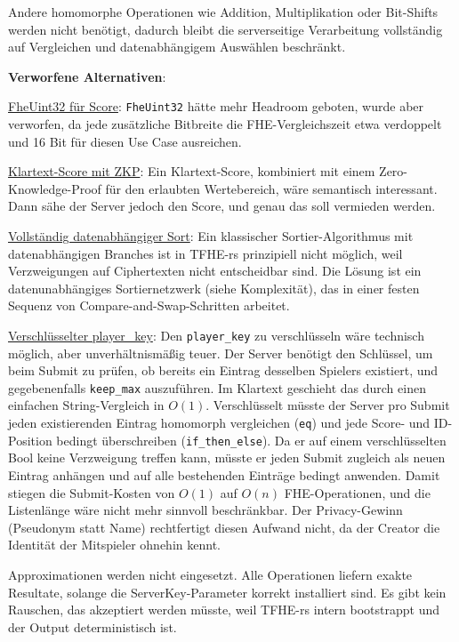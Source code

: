 Andere homomorphe Operationen wie Addition, Multiplikation oder Bit-Shifts werden nicht benötigt, dadurch bleibt die serverseitige Verarbeitung vollständig auf Vergleichen und datenabhängigem Auswählen beschränkt.

\textbf{Verworfene Alternativen}:

\underline{FheUint32 für Score}: \texttt{FheUint32} hätte mehr Headroom geboten, wurde aber verworfen, da jede zusätzliche Bitbreite die FHE-Vergleichszeit etwa verdoppelt und 16 Bit für diesen Use Case ausreichen.

\underline{Klartext-Score mit ZKP}: Ein Klartext-Score, kombiniert mit einem Zero-Knowledge-Proof für den erlaubten Wertebereich, wäre semantisch interessant. Dann sähe der Server jedoch den Score, und genau das soll vermieden werden.

\underline{Vollständig datenabhängiger Sort}: Ein klassischer Sortier-Algorithmus mit datenabhängigen Branches ist in TFHE-rs prinzipiell nicht möglich, weil Verzweigungen auf Ciphertexten nicht entscheidbar sind. Die Lösung ist ein datenunabhängiges Sortiernetzwerk (siehe Komplexität), das in einer festen Sequenz von Compare-and-Swap-Schritten arbeitet.

\underline{Verschlüsselter player\_key}: Den \texttt{player\_key} zu verschlüsseln wäre technisch möglich, aber unverhältnismäßig teuer. Der Server benötigt den Schlüssel, um beim Submit zu prüfen, ob bereits ein Eintrag desselben Spielers existiert, und gegebenenfalls \texttt{keep\_max} auszuführen. Im Klartext geschieht das durch einen einfachen String-Vergleich in $O(1)$. Verschlüsselt müsste der Server pro Submit jeden existierenden Eintrag homomorph vergleichen (\texttt{eq}) und jede Score- und ID-Position bedingt überschreiben (\texttt{if\_then\_else}). Da er auf einem verschlüsselten Bool keine Verzweigung treffen kann, müsste er jeden Submit zugleich als neuen Eintrag anhängen und auf alle bestehenden Einträge bedingt anwenden. Damit stiegen die Submit-Kosten von $O(1)$ auf $O(n)$ FHE-Operationen, und die Listenlänge wäre nicht mehr sinnvoll beschränkbar. Der Privacy-Gewinn (Pseudonym statt Name) rechtfertigt diesen Aufwand nicht, da der Creator die Identität der Mitspieler ohnehin kennt.

Approximationen werden nicht eingesetzt. Alle Operationen liefern exakte Resultate, solange die ServerKey-Parameter korrekt installiert sind. Es gibt kein Rauschen, das akzeptiert werden müsste, weil TFHE-rs intern bootstrappt und der Output deterministisch ist.

